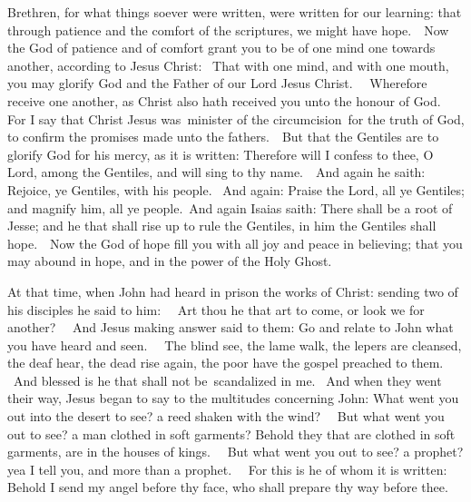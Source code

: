 \begin{multicols}{2}
Brethren, for what things soever were written, were written for our learning: that
through patience and the comfort of the scriptures, we might have hope.  Now
the God of patience and of comfort grant you to be of one mind one towards
another, according to Jesus Christ:  That with one mind, and with one mouth,
you may glorify God and the Father of our Lord Jesus Christ.   Wherefore
receive one another, as Christ also hath received you unto the honour of God.  
For I say that Christ Jesus was minister of the circumcision for the truth of God, to confirm the
promises made unto the fathers.  But that the Gentiles are to glorify God for
his mercy, as it is written: Therefore will I confess to thee, O Lord, among
the Gentiles, and will sing to thy name.  And again he saith: Rejoice, ye
Gentiles, with his people.   And again: Praise the Lord, all ye Gentiles; and
magnify him, all ye people. And again Isaias saith: There shall be a root of
Jesse; and he that shall rise up to rule the Gentiles, in him the Gentiles
shall hope.  Now the God of hope fill you with all joy and peace in believing;
that you may abound in hope, and in the power of the Holy Ghost. 



At that time, when John had heard in prison the works of Christ: sending two of his
disciples he said to him:   Art thou he that art to come, or look we for
another?   And Jesus making answer said to them: Go and relate to John what you
have heard and seen.   The blind see, the lame walk, the lepers are cleansed,
the deaf hear, the dead rise again, the poor have the gospel preached to them.
 And blessed is he that shall not be scandalized in me.  And
when they went their way, Jesus began to say to the multitudes concerning John:
What went you out into the desert to see? a reed shaken with the wind?   But
what went you out to see? a man clothed in soft garments?  Behold they that are
clothed in soft garments, are in the houses of kings.   But what went you out
to see? a prophet? yea I tell you, and more than a prophet.   For this is he of
whom it is written: Behold I send my angel before thy face, who shall prepare
thy way before thee.

\bigskip


\end{multicols}
